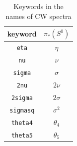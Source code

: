 \documentclass{amsart}
\numberwithin{equation}{section}
\begin{document}
\begin{table}\begin{tabular}{|c|c|}\hline
    keyword & $\pi_*(S^0)$ \\\hline
    \texttt{eta} & $\eta$ \\\hline
    \texttt{nu} & $\nu$\\\hline
    \texttt{sigma} & $\sigma$\\\hline
    \texttt{2nu} & $2\nu$\\\hline
    \texttt{2sigma} & $2\sigma$\\\hline
    \texttt{sigmasq} & $\sigma^2$\\\hline
    \texttt{theta4} & $\theta_4$\\\hline
    \texttt{theta5} & $\theta_5$\\\hline
\end{tabular}\caption{Keywords in the names of CW spectra}\label{tb:key}
\end{table}
\end{document}
